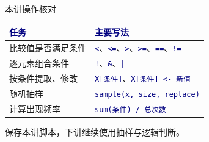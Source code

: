 \documentclass[14pt,compress,t,noamsthm,notheorem,table,handout,fontset=none]{ctexbeamer}
\newcommand{\code}[1]{\textcolor{navy}{\texttt{#1}}}
\newcommand{\thead}[1]{\textcolor{navy}{\textbf{#1}}}
\begin{document}
\begin{frame}{本讲操作核对}
  \small
  \renewcommand{\arraystretch}{1.3}
  \begin{tabular*}{\linewidth}{@{\extracolsep{\fill}}ll@{}}
    \toprule
    \thead{任务} & \thead{主要写法} \\
    \midrule
    比较值是否满足条件 & \code{<}、\code{<=}、\code{>}、\code{>=}、\code{==}、\code{!=} \\
    逐元素组合条件 & \code{!}、\code{\&}、\code{|} \\
    按条件提取、修改 & \code{X[\textsf{条件}]}、\code{X[\textsf{条件}] <- \textsf{新值}} \\
    随机抽样 & \code{sample(x, size, replace)} \\
    计算出现频率 & \code{sum(\textsf{条件}) / \textsf{总次数}} \\
    \bottomrule
  \end{tabular*}
  \par\vspace{0.5em}
  保存本讲脚本，下讲继续使用抽样与逻辑判断。
\end{frame}
\end{document}
